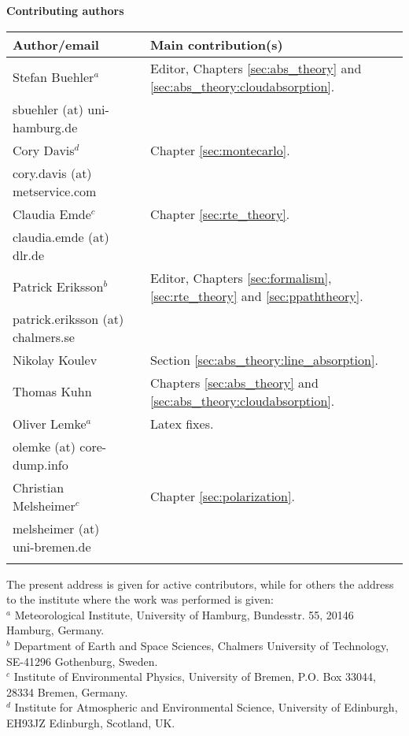 \documentclass[11pt,twoside,a4paper,fleqn]{book}
\begin{document}
%
\newpage
\thispagestyle{plain}
%
\begin{center}
  {\Large \bf Contributing authors}
\end{center}
\vspace*{10mm}
\begin{tabular}{lp{10mm}l}
  \hline
  {\bf Author/email} & & {\bf Main contribution(s)} \\
  \hline
  Stefan Buehler$^a$ & & Editor, Chapters \ref{sec:abs_theory} and \ref{sec:abs_theory:cloudabsorption}.\\
  sbuehler (at) uni-hamburg.de & &        \\
  \hline
  Cory Davis$^d$ & & Chapter \ref{sec:montecarlo}. \\
  cory.davis (at) metservice.com & & \\
  \hline
 Claudia Emde$^c$ & & Chapter \ref{sec:rte_theory}.\\
  claudia.emde (at) dlr.de & & \\
  \hline
  Patrick Eriksson$^b$ &  & Editor, 
  Chapters \ref{sec:formalism},
  \ref{sec:rte_theory} and \ref{sec:ppaththeory}.\\
  patrick.eriksson (at) chalmers.se & & \\
  \hline
  Nikolay Koulev & & Section \ref{sec:abs_theory:line_absorption}.\\
  \hline
  Thomas Kuhn & & Chapters \ref{sec:abs_theory} and \ref{sec:abs_theory:cloudabsorption}.\\
  \hline
  Oliver Lemke$^a$ & & Latex fixes.\\
  olemke (at) core-dump.info & & \\
  \hline
  Christian Melsheimer$^c$ & & Chapter \ref{sec:polarization}.\\
  melsheimer (at) uni-bremen.de & & \\
  \hline
 &&\\
\end{tabular}

\noindent
The present address is given for active contributors, while for others
the address to the institute where the work was performed is given:\\
$^a$ Meteorological Institute, University of Hamburg, Bundesstr. 55,
20146 Hamburg, Germany.\\
$^b$ Department of Earth and Space Sciences, Chalmers University of Technology,
SE-41296 Gothenburg, Sweden. \\
$^c$ Institute of Environmental Physics, University of Bremen, P.O. Box 33044, 
28334 Bremen, Germany. \\
$^d$ Institute for Atmospheric and Environmental Science, University of 
Edinburgh, EH93JZ Edinburgh, Scotland, UK. \\
\end{document}
